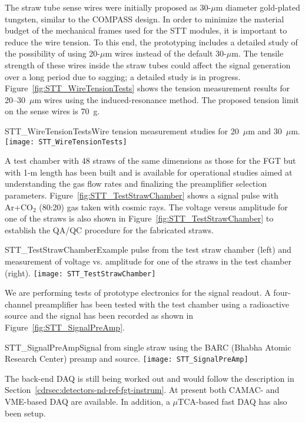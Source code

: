 The straw tube sense wires were initially proposed as 30-$\mu$m
diameter gold-plated tungsten, similar to the COMPASS design. In order
to minimize the material budget of the mechanical frames used for the
STT modules, it is important to reduce the wire tension. To this end,
the prototyping includes a detailed study of the possibility of using
20-$\mu$m wires instead of the default 30-$\mu$m. The tensile strength
of these wires inside the straw tubes could affect the signal
generation over a long period due to sagging; a detailed study is in
progress.  Figure~\ref{fig:STT_WireTensionTests} shows the tension
measurement results for 20--30~$\mu$m wires using the
induced-resonance method.  The proposed tension limit on the sense
wires is 70~g.
\begin{cdrfigure}
{STT_WireTensionTests}{Wire tension measurement studies for 20~$\mu$m and 30~$\mu$m.}
\texttt{[image: STT\_WireTensionTests]}
\end{cdrfigure}


A test chamber with 48 straws of the same dimensions as those for the
FGT but with 1-m length has been built and is available for
operational studies aimed at understanding the gas flow rates and
finalizing the preamplifier selection parameters.
Figure~\ref{fig:STT_TestStrawChamber} shows a signal pulse with
Ar+CO$_2$ (80:20) gas taken with cosmic rays. The voltage versus
amplitude for one of the straws is also shown in
Figure~\ref{fig:STT_TestStrawChamber} to establish the QA/QC procedure
for the fabricated straws.
\begin{cdrfigure}
{STT_TestStrawChamber}{Example pulse from the test straw chamber (left) and
measurement of voltage vs. amplitude for one of the straws in the test chamber (right).}
\texttt{[image: STT\_TestStrawChamber]}
\end{cdrfigure}


We are performing tests of prototype electronics for the signal
readout.  A four-channel preamplifier has been tested with the test
chamber using a radioactive source and the signal has been recorded as
shown in Figure~\ref{fig:STT_SignalPreAmp}.
\begin{cdrfigure}
{STT_SignalPreAmp}{Signal from single straw using the BARC (Bhabha Atomic Research Center) preamp and source.}
\texttt{[image: STT\_SignalPreAmp]}
\end{cdrfigure}
The back-end DAQ is still being worked out and would follow the
description in Section~\ref{cdrsec:detectors-nd-ref-fgt-instrum}. At
present both CAMAC- and VME-based DAQ are available. In addition, a
$\mu$TCA-based fast DAQ has also been setup.


